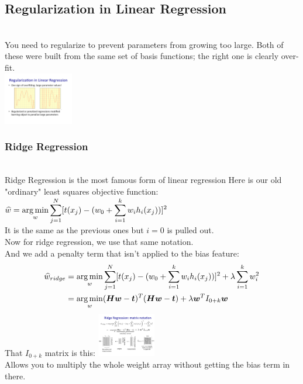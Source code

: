 \subsection{Regularization in Linear Regression}  \hfill \\
You need to regularize to prevent parameters from growing too large.  
Both of these were built from the same set of basis functions; the right one is clearly over-fit. \hfill \\
\includegraphics[width=1.2in]{figures/need_to_regularize.pdf}

\subsubsection{Ridge Regression}  \hfill \\
Ridge Regression is the most famous form of linear regression
Here is our old "ordinary" least squares objective function:   \hfill \\
$\displaystyle \widehat{w} = \operatorname*{arg\,min}_w \sum_{j=1}^N [t(x_j) - (w_0 + \sum_{i=1}^k w_i h_i(x_j))]^2$   \hfill \\
It is the same as the previous ones but $i=0$ is pulled out.    \hfill \\
Now for ridge regression, we use that same notation.  \hfill \\
And we add a penalty term that isn't applied to the bias feature:
\begin{align*}
	\widehat{w}_{ridge} &= \operatorname*{arg\,min}_w \sum_{j=1}^N [t(x_j) - (w_0 + \sum_{i=1}^k w_i h_i(x_j))]^2 + \lambda \sum_{i=1}^k w_i^2   \\
	&= \operatorname*{arg\,min}_w (\bm{H}\bm{w} - \bm{t})^T(\bm{H}\bm{w}-\bm{t}) + \lambda \bm{w}^T I_{0+k} \bm{w}
\end{align*}
That $I_{0+k}$ matrix is this: 
\includegraphics[width=1.0in]{figures/ridge_identity_matrix_with_zero.pdf}  \hfill \\
Allows you to multiply the whole weight array without getting the bias term in there. 

